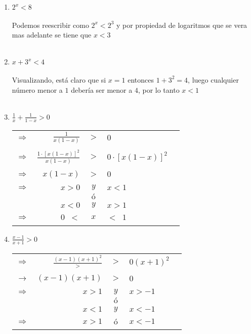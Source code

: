 \begin{enumerate}[\bfseries 1.]
\begin{enumerate}[\bfseries i)]
\item $2^x<8$\\\\
Podemos reescribir como $2^x<2^3$ y por propiedad de logaritmos que se vera mas adelante se tiene que $x<3$\\\\

\item $x+3^x <4$\\\\
Visualizando, está claro que si $x=1$ entonces $1+3^2=4$, luego cualquier número menor a $1$ debería ser menor a $4$, por lo tanto $x<1$\\\\

\item $\displaystyle\frac{1}{x} + \frac{1}{1-x}>0$
\begin{center}
\begin{tabular}{crcll}
$\Rightarrow$&$\displaystyle\frac{1}{x(1-x)}$&$>$&$0$&\\\\
$\Rightarrow$&$\displaystyle\frac{1\cdot \left[ x(1-x)\right]^2}{x(1-x)}$&$>$&$0\cdot \left[ x(1-x)\right] ^2$&\\\\
$\Rightarrow$&$x(1-x)$&$>$&$0$&\\\\
$\Rightarrow$&$x>0$&$y$&$x<1$&\\
&&$ó$&&\\
&$x<0$&$y$&$x>1$&\\\\
$\Rightarrow$&$0\; \; <$&$x$&$<\; \; 1$&\\\\
\end{tabular}
\end{center}

\item $\displaystyle\frac{x-1}{x+1}>0$
\begin{center}
\begin{tabular}{crcll}
$\Rightarrow$&$\displaystyle\frac{(x-1)(x+1)^2}{>}$&$>$&$0(x+1)^2$&\\\\
$\rightarrow$&$(x-1)(x+1)$&$>$&$0$&\\\\
$\Rightarrow$&$x>1$&$y$&$x>-1$&\\
&&$ó$&&\\
&$x<1$&$y$&$x<-1$&\\\\
$\Rightarrow$&$x>1$&$ó$&$x<-1$&\\\\
\end{tabular}
\end{center} 
\end{enumerate}


\end{enumerate}
